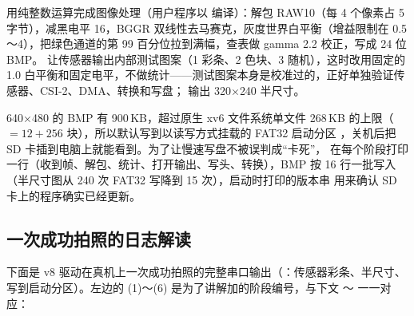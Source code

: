  用纯整数运算完成图像处理（用户程序以  编译）：解包 RAW10（每 4 个像素占 5 字节），减黑电平 16，BGGR 双线性去马赛克，灰度世界白平衡（增益限制在 0.5～4），把绿色通道的第 99 百分位拉到满幅，查表做 gamma 2.2 校正，写成 24 位 BMP。 让传感器输出内部测试图案（1 彩条、2 色块、3 随机），这时改用固定的 1.0 白平衡和固定电平，不做统计——测试图案本身是校准过的，正好单独验证传感器、CSI-2、DMA、转换和写盘； 输出 320$\times$240 半尺寸。

640$\times$480 的 BMP 有 900\,KB，超过原生 xv6 文件系统单文件 268\,KB 的上限（$=12+256$ 块），所以默认写到以读写方式挂载的 FAT32 启动分区 ，关机后把 SD 卡插到电脑上就能看到。为了让慢速写盘不被误判成“卡死”， 在每个阶段打印一行（收到帧、解包、统计、打开输出、写头、转换），BMP 按 16 行一批写入（半尺寸图从 240 次 FAT32 写降到 15 次），启动时打印的版本串  用来确认 SD 卡上的程序确实已经更新。

\subsection{一次成功拍照的日志解读}
\label{sec:cam-log}

下面是 v8 驱动在真机上一次成功拍照的完整串口输出（：传感器彩条、半尺寸、写到启动分区）。左边的 (1)～(6) 是为了讲解加的阶段编号，与下文 ～ 一一对应：

